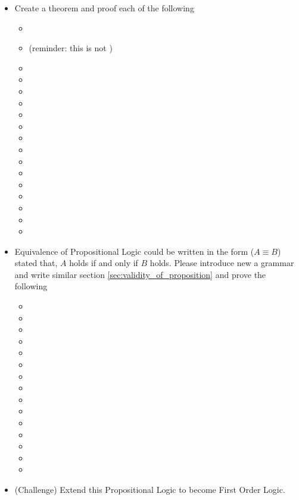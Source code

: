 \documentclass[master.tex]{subfiles}
\begin{document}
\begin{itemize}
\item Create a theorem and proof each of the following
  \begin{itemize}
  \item {}
  \item {} (reminder: this is  not )
  \item {}
  \item {}
  \item {}
  \item {}
  \item {}
  \item {}
  \item {}
  \item {}
  \item {}
  \item {}
  \item {}
  \item {}
  \item {}
  \item {}
  \item {}
  \end{itemize}
\item Equivalence of Propositional Logic could be written in the form ($A \equiv
  B$) stated that, $A$ holds if and only if $B$ holds. Please
  introduce new a grammar  and write 
  similar section \ref{sec:validity_of_proposition} and prove the following
  \begin{itemize}
  \item {}
  \item {}
  \item {}
  \item {}
  \item {}
  \item {}
  \item {}
  \item {}
  \item {}
  \item {}
  \item {}
  \item {}
  \item {}
  \item {}
  \item {}
  \end{itemize}
\item (Challenge) Extend this Propositional Logic to become First Order Logic.
\end{itemize}
\end{document}
